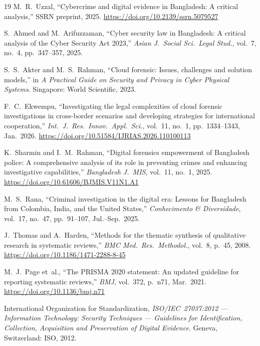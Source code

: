 \documentclass[sigconf,nonacm]{acmart}
\begin{document}
\begin{thebibliography}{19}
M.~R.~Uzzal,
``Cybercrime and digital evidence in Bangladesh: A critical analysis,''
SSRN preprint, 2025.
\newblock \url{https://doi.org/10.2139/ssrn.5079527}

S.~Ahmed and M.~Arifuzzaman,
``Cyber security law in Bangladesh: A critical analysis of the Cyber
Security Act 2023,''
\textit{Asian J.\ Social Sci.\ Legal Stud.}, vol.~7, no.~4, pp.~347--357, 2025.

S.~S.~Akter and M.~S.~Rahman,
``Cloud forensic: Issues, challenges and solution models,''
in \textit{A Practical Guide on Security and Privacy in Cyber Physical
Systems}. Singapore: World Scientific, 2023.

F.~C.~Ekwempu,
``Investigating the legal complexities of cloud forensic investigations in
cross-border scenarios and developing strategies for international
cooperation,''
\textit{Int.\ J.\ Res.\ Innov.\ Appl.\ Sci.}, vol.~11, no.~1,
pp.~1334--1343, Jan.~2026.
\newblock \url{https://doi.org/10.51584/IJRIAS.2026.110100113}

K.~Sharmin and I.~M.~Rahman,
``Digital forensics empowerment of Bangladesh police: A comprehensive
analysis of its role in preventing crimes and enhancing investigative
capabilities,''
\textit{Bangladesh J.\ MIS}, vol.~11, no.~1, 2025.
\newblock \url{https://doi.org/10.61606/BJMIS.V11N1.A1}

M.~S.~Rana,
``Criminal investigation in the digital era: Lessons for Bangladesh from
Colombia, India, and the United States,''
\textit{Conhecimento \& Diversidade}, vol.~17, no.~47, pp.~91--107,
Jul.--Sep.~2025.

J.~Thomas and A.~Harden,
``Methods for the thematic synthesis of qualitative research in systematic
reviews,''
\textit{BMC Med.\ Res.\ Methodol.}, vol.~8, p.~45, 2008.
\newblock \url{https://doi.org/10.1186/1471-2288-8-45}

M.~J.~Page et~al.,
``The PRISMA 2020 statement: An updated guideline for reporting systematic
reviews,''
\textit{BMJ}, vol.~372, p.~n71, Mar.~2021.
\newblock \url{https://doi.org/10.1136/bmj.n71}

International Organization for Standardization,
\textit{ISO/IEC~27037:2012 --- Information Technology: Security Techniques
--- Guidelines for Identification, Collection, Acquisition and Preservation
of Digital Evidence}.
Geneva, Switzerland: ISO, 2012.

\end{thebibliography}
\end{document}
